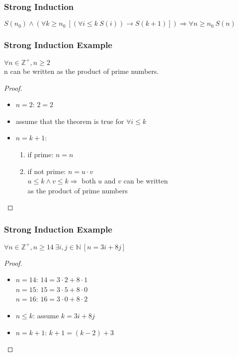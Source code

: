 \documentclass[dvipsnames]{beamer}
\begin{document}
\begin{frame}
  \frametitle{Strong Induction}

  \begin{definition}
    $S(n_0) \wedge
      (\forall k \geq n_0~[(\forall i \leq k~S(i)) \rightarrow S(k+1)])
      \Rightarrow \forall n \geq n_0~S(n)$
  \end{definition}
\end{frame}

\begin{frame}
  \frametitle{Strong Induction Example}

  \begin{theorem}
    $\forall n \in \mathbb{Z}^+, n \geq 2$\\
      n can be written as the product of prime numbers.
  \end{theorem}

  \pause
  \begin{proof}
    \begin{itemize}
      \item $n=2$: $2=2$

      \pause
      \item assume that the theorem is true for $\forall i \leq k$

      \pause
      \item $n=k+1$:
      \begin{enumerate}
        \item if prime: $n=n$

        \pause
        \item if not prime: $n=u \cdot v$\\
          $u \leq k \wedge v \leq k \Rightarrow$ both $u$ and $v$ can be written\\
          as the product of prime numbers
      \end{enumerate}
    \end{itemize}
  \end{proof}
\end{frame}

\begin{frame}
  \frametitle{Strong Induction Example}

  \begin{theorem}
    $\forall n \in \mathbb{Z}^+, n \geq 14~\exists i,j \in \mathbb{N}~[n=3i+8j]$
  \end{theorem}

  \pause
  \begin{proof}
    \begin{itemize}
      \item $n=14$: $14=3 \cdot 2 + 8 \cdot 1$\\
        $n=15$: $15=3 \cdot 5 + 8 \cdot 0$\\
        $n=16$: $16=3 \cdot 0 + 8 \cdot 2$

      \pause
      \item $n \leq k$: assume $k=3i+8j$

      \pause
      \item $n=k+1$: $k+1=(k-2)+3$
    \end{itemize}
  \end{proof}
\end{frame}
\end{document}
